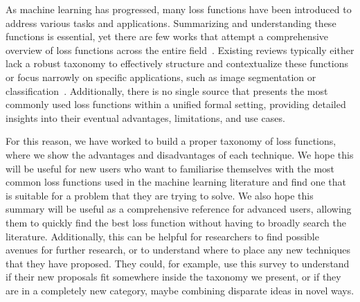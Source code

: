 \documentclass[sn-mathphys-num]{sn-jnl}%
\begin{document}
    As machine learning has progressed, many loss functions have been introduced to address various tasks and applications. Summarizing and understanding these functions is essential, yet there are few works that attempt a comprehensive overview of loss functions across the entire field~\cite{wang2020comprehensive}. Existing reviews typically either lack a robust taxonomy to effectively structure and contextualize these functions or focus narrowly on specific applications, such as image segmentation or classification~\cite{wang2021survey, jadon2020survey}. Additionally, there is no single source that presents the most commonly used loss functions within a unified formal setting, providing detailed insights into their eventual advantages, limitations, and use cases.
    
    
    For this reason, we have worked to build a proper taxonomy of loss functions, where we show the advantages and disadvantages of each technique. We hope this will be useful for new users who want to familiarise themselves with the most common loss functions used in the machine learning literature and find one that is suitable for a problem that they are trying to solve. We also hope this summary will be useful as a comprehensive reference for advanced users, allowing them to quickly find the best loss function without having to broadly search the literature.  Additionally, this can be helpful for researchers to find possible avenues for further research, or to understand where to place any new techniques that they have proposed. They could, for example, use this survey to understand if their new proposals fit somewhere inside the taxonomy we present, or if they are in a completely new category, maybe combining disparate ideas in novel ways. %
    
\end{document}
